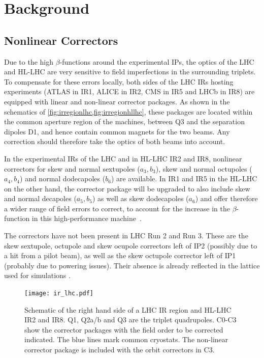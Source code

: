 \section{Background}

\subsection{Nonlinear Correctors}

Due to the high $\beta$-functions around the experimental IPs, 
the optics of the LHC and HL-LHC are very sensitive to field imperfections in the surrounding triplets.
To compensate for these errors locally, both sides of the LHC IRs hosting experiments 
(ATLAS in IR1, ALICE in IR2, CMS in IR5 and LHCb in IR8) are equipped with linear and non-linear corrector packages.
As shown in the schematics of \cref{fig:irregionlhc,fig:irregionhllhc}, 
these packages are located within the common aperture region of the machines, between Q3 and the separation dipoles D1,
and hence contain common magnets for the two beams. 
Any correction should therefore take the optics of both beams into account.

In the experimental IRs of the LHC and in HL-LHC IR2 and IR8, nonlinear correctors for
skew and normal sextupoles ($a_3, b_3$), skew and normal octupoles ($a_4, b_4$) 
and normal dodecapoles ($b_6$) are available.
In IR1 and IR5 in the HL-LHC on the other hand, the corrector package will be upgraded to 
also include skew and normal decapoles ($a_5, b_5$) as well as skew dodecapoles ($a_6$)
and offer therefore a wider range of field errors to correct, to account for the 
increase in the $\beta$-function in this high-performance 
machine~\cite{BejarAlonsoHighLuminosityLargeHadron2020,DeMariaHighLuminosityLHC2019,BuffatOpticsMeasurementCorrection2022}.


The correctors  have not been present in LHC Run 2 and Run 3.
These are the skew sextupole, octupole and skew ocupole correctors left of IP2 (possibly due to a hit from a pilot beam), 
as well as the skew octupole corrector left of IP1 (probably due to powering issues).
Their absence is already reflected in the lattice used for simulations \cite{DeMariaCERNOpticsRepository}.


\begin{figure}[h!]
    \centering
    \texttt{[image: ir\_lhc.pdf]}
    \caption{Schematic of the right hand side of a LHC IR region and HL-LHC IR2 and IR8.
    Q1, Q2a/b and Q3 are the triplet quadrupoles.
    C0-C3 show the corrector packages with the field order to be corrected indicated. 
    The blue lines mark common cryostats. 
    The non-linear corrector package is included with the orbit correctors in C3.
    }
    \label{fig:irregionlhc}
\end{figure}


